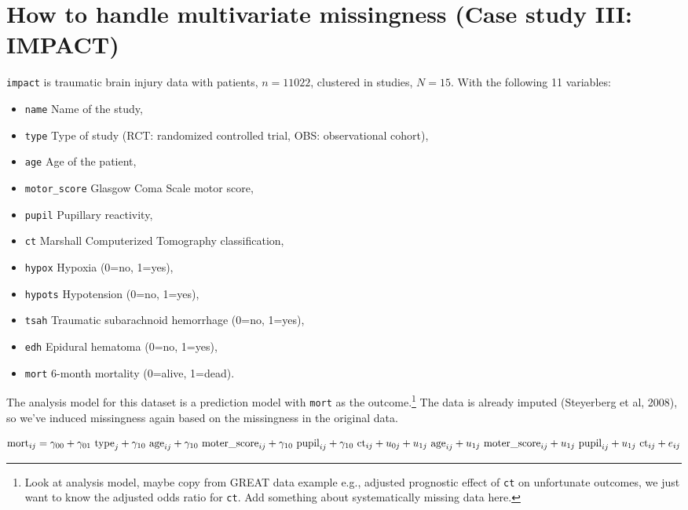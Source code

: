 \documentclass[
]{jss}
\providecommand{\tightlist}{%
  \setlength{\itemsep}{0pt}\setlength{\parskip}{0pt}}
\begin{document}
\hypertarget{how-to-handle-multivariate-missingness-case-study-iii-impact}{%
\section{How to handle multivariate missingness (Case study III:
IMPACT)}\label{how-to-handle-multivariate-missingness-case-study-iii-impact}}

\texttt{impact} is traumatic brain injury data with patients,
\(n = 11022\), clustered in studies, \(N = 15\). With the following 11
variables:

\begin{itemize}
\tightlist
\item
  \texttt{name} Name of the study,
\item
  \texttt{type} Type of study (RCT: randomized controlled trial, OBS:
  observational cohort),
\item
  \texttt{age} Age of the patient,
\item
  \texttt{motor\_score} Glasgow Coma Scale motor score,
\item
  \texttt{pupil} Pupillary reactivity,
\item
  \texttt{ct} Marshall Computerized Tomography classification,
\item
  \texttt{hypox} Hypoxia (0=no, 1=yes),
\item
  \texttt{hypots} Hypotension (0=no, 1=yes),
\item
  \texttt{tsah} Traumatic subarachnoid hemorrhage (0=no, 1=yes),
\item
  \texttt{edh} Epidural hematoma (0=no, 1=yes),
\item
  \texttt{mort} 6-month mortality (0=alive, 1=dead).
\end{itemize}

The analysis model for this dataset is a prediction model with
\texttt{mort} as the outcome.\footnote{Look at analysis model, maybe
  copy from GREAT data example e.g., adjusted prognostic effect of
  \texttt{ct} on unfortunate outcomes, we just want to know the adjusted
  odds ratio for \texttt{ct}. Add something about systematically missing
  data here.} The data is already imputed (Steyerberg et al, 2008), so
we've induced missingness again based on the missingness in the original
data.

\[
\text{mort}_{ij} =
\gamma_{00} + 
\gamma_{01} \text{ type}_{j} + 
\gamma_{10} \text{ age}_{ij} + 
\gamma_{10} \text{ moter\_score}_{ij} + 
\gamma_{10} \text{ pupil}_{ij} + 
\gamma_{10} \text{ ct}_{ij} + \\
u_{0j} + 
u_{1j} \text{ age}_{ij} + 
u_{1j} \text{ moter\_score}_{ij} +  
u_{1j} \text{ pupil}_{ij} +  
u_{1j} \text{ ct}_{ij} +  
e_{ij} \\
\]
\end{document}
